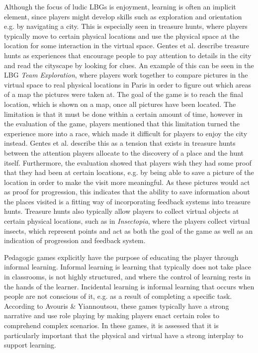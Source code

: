Although the focus of ludic LBGs is enjoyment, learning is often an implicit element, since players might develop skills such as exploration and orientation e.g. by navigating a city. This is especially seen in treasure hunts, where players typically move to certain physical locations and use the physical space at the location for some interaction in the virtual space. Gentes et al. describe treasure hunts as experiences that encourage people to pay attention to details in the city and read the cityscape by looking for clues. An example of this can be seen in the LBG \textit{Team Exploration}, where players work together to compare pictures in the virtual space to real physical locations in Paris in order to figure out which areas of a map the pictures were taken at\cite{GamingOnTheMove}. The goal of the game is to reach the final location, which is shown on a map, once all pictures have been located. The limitation is that it must be done within a certain amount of time, however in the evaluation of the game, players mentioned that this limitation turned the experience more into a race, which made it difficult for players to enjoy the city instead. Gentes et al. describe this as a tension that exists in treasure hunts between the attention players allocate to the discovery of a place and the hunt itself\cite{GamingOnTheMove}. Furthermore, the evaluation showed that players wish they had some proof that they had been at certain locations, e.g. by being able to save a picture of the location in order to make the visit more meaningful. As these pictures would act as proof for progression, this indicates that the ability to save information about the places visited is a fitting way of incorporating feedback systems into treasure hunts. Treasure hunts also typically allow players to collect virtual objects at certain physical locations\cite{LBG_Review}, such as in \textit{Insectopia}, where the players collect virtual insects, which represent points and act as both the goal of the game as well as an indication of progression and feedback system\cite{Insectopia}.

Pedagogic games explicitly have the purpose of educating the player through informal learning\cite{LBG_Review}. Informal learning is learning that typically does not take place in classrooms, is not highly structured, and where the control of learning rests in the hands of the learner\cite{informallearning}. Incidental learning is informal learning that occurs when people are not conscious of it, e.g. as a result of completing a specific task\cite{informallearning}. According to Avouris \& Yiannoutsou, these games typically have a strong narrative and use role playing by making players enact certain roles to comprehend complex scenarios\cite{LBG_Review}. In these games, it is assessed that it is particularly important that the physical and virtual have a strong interplay to support learning.

